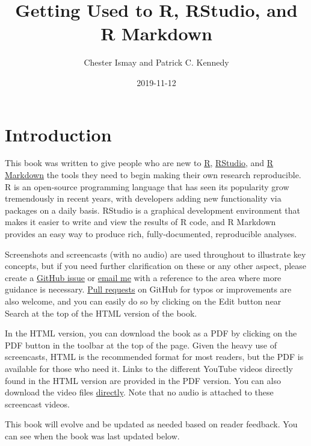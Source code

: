 \documentclass[]{tufte-book}
\title{Getting Used to R, RStudio, and R Markdown}
\author{Chester Ismay and Patrick C. Kennedy}
\date{2019-11-12}
\begin{document}
\maketitle



{
\setcounter{tocdepth}{1}
\tableofcontents
}

\hypertarget{intro}{%
\chapter{Introduction}\label{intro}}

This book was written to give people who are new to \href{https://www.r-project.org}{R}, \href{https://www.rstudio.com}{RStudio}, and \href{http://rmarkdown.rstudio.com}{R Markdown} the tools they need to begin making their own research reproducible. R is an open-source programming language that has seen its popularity grow tremendously in recent years, with developers adding new functionality via packages on a daily basis. RStudio is a graphical development environment that makes it easier to write and view the results of R code, and R Markdown provides an easy way to produce rich, fully-documented, reproducible analyses.

Screenshots and screencasts (with no audio) are used throughout to illustrate key concepts, but if you need further clarification on these or any other aspect, please create a \href{https://github.com/ismayc/rbasics-book/issues}{GitHub issue} or \href{mailto:chester.ismay@gmail.com}{email me} with a reference to the area where more guidance is necessary. \href{https://code.tutsplus.com/courses/git-basics-github-pull-requests}{Pull requests} on GitHub for typos or improvements are also welcome, and you can easily do so by clicking on the Edit button near Search at the top of the HTML version of the book.

In the HTML version, you can download the book as a PDF by clicking on the PDF button in the toolbar at the top of the page. Given the heavy use of screencasts, HTML is the recommended format for most readers, but the PDF is available for those who need it. Links to the different YouTube videos directly found in the HTML version are provided in the PDF version. You can also download the video files \href{https://github.com/ismayc/rbasics-book/tree/master/mp4}{directly}. Note that no audio is attached to these screencast videos.

This book will evolve and be updated as needed based on reader feedback. You can see when the book was last updated below.
\end{document}
